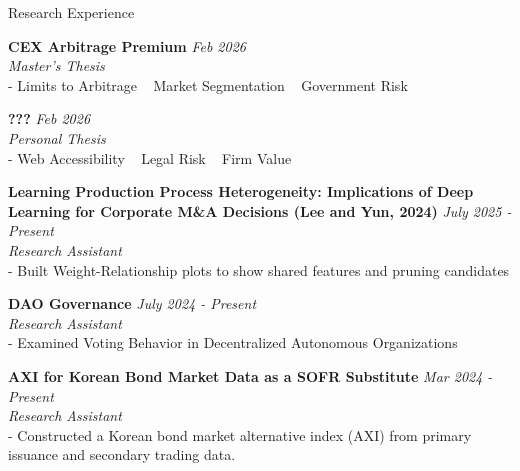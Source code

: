 \documentclass{resume} %
\begin{document}
\begin{rSection}{Research Experience}

{\bf CEX Arbitrage Premium  } \hfill {\em Feb 2026}
\\ { \textit {Master's Thesis}} 
\\ - Limits to Arbitrage ~ Market Segmentation ~ Government Risk

{\bf ??? } \hfill {\em Feb 2026}
\\ { \textit {Personal Thesis}} 
\\ - Web Accessibility ~ Legal Risk ~ Firm Value

{\bf Learning Production Process Heterogeneity: Implications of Deep Learning for Corporate M\&A Decisions (Lee and Yun, 2024)} \hfill {\em July 2025 - Present}
\\ { \textit {Research Assistant}} 
\\ - Built Weight-Relationship plots to show shared features and pruning candidates 

{\bf DAO Governance} \hfill {\em July 2024 - Present}
\\ { \textit {Research Assistant}} 
\\ - Examined Voting Behavior in Decentralized Autonomous Organizations

{\bf AXI for Korean Bond Market Data as a SOFR Substitute} \hfill {\em Mar 2024 - Present}
\\ { \textit {Research Assistant}} 
\\ - Constructed a Korean bond market alternative index (AXI) from primary issuance and secondary trading data.

\end{rSection}

\end{document}
